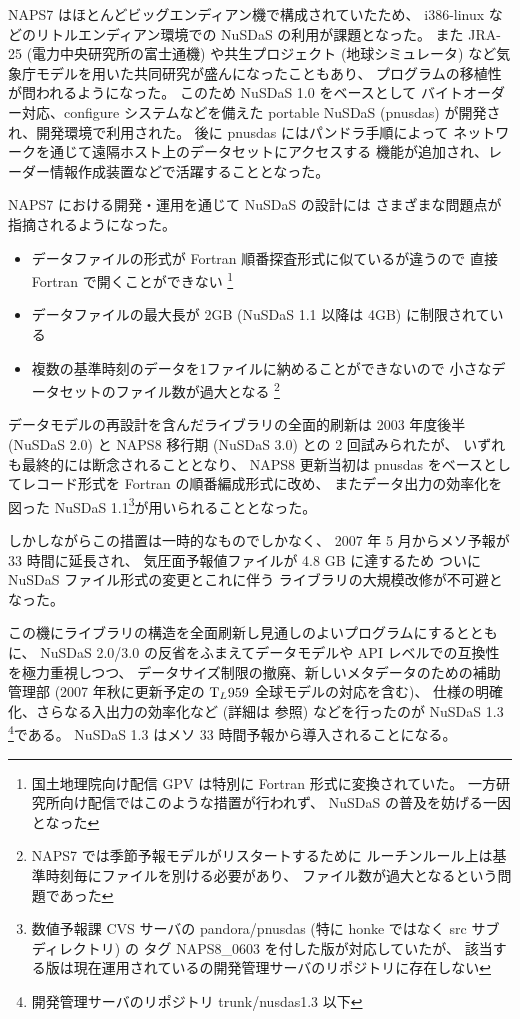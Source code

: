 NAPS7 はほとんどビッグエンディアン機で構成されていたため、
i386-linux などのリトルエンディアン環境での NuSDaS の利用が課題となった。
また JRA-25 (電力中央研究所の富士通機) や共生プロジェクト (地球シミュレータ)
など気象庁モデルを用いた共同研究が盛んになったこともあり、
プログラムの移植性が問われるようになった。
このため NuSDaS 1.0 をベースとして
バイトオーダー対応、configure システムなどを備えた portable NuSDaS
(pnusdas) が開発され、開発環境で利用された。
後に pnusdas にはパンドラ手順によって
ネットワークを通じて遠隔ホスト上のデータセットにアクセスする
機能が追加され、レーダー情報作成装置などで活躍することとなった。

NAPS7 における開発・運用を通じて NuSDaS の設計には
さまざまな問題点が指摘されるようになった。
\begin{itemize}
 \item データファイルの形式が Fortran 順番探査形式に似ているが違うので
 直接 Fortran で開くことができない%
 \footnote{国土地理院向け配信 GPV は特別に Fortran 形式に変換されていた。
 一方研究所向け配信ではこのような措置が行われず、
 NuSDaS の普及を妨げる一因となった}
 \item
 データファイルの最大長が 2GB (NuSDaS 1.1 以降は 4GB)
 に制限されている
 \item 複数の基準時刻のデータを1ファイルに納めることができないので
 小さなデータセットのファイル数が過大となる%
 \footnote{NAPS7 では季節予報モデルがリスタートするために
 ルーチンルール上は基準時刻毎にファイルを別ける必要があり、
 ファイル数が過大となるという問題であった}
\end{itemize}
データモデルの再設計を含んだライブラリの全面的刷新は
2003 年度後半 (NuSDaS 2.0) と
NAPS8 移行期 (NuSDaS 3.0) との 2 回試みられたが、
いずれも最終的には断念されることとなり、
NAPS8 更新当初は pnusdas をベースとしてレコード形式を
Fortran の順番編成形式に改め、
またデータ出力の効率化を図った NuSDaS 1.1\footnote{
	数値予報課 CVS サーバの pandora/pnusdas
	(特に honke ではなく src サブディレクトリ) の
	タグ NAPS8\_0603 を付した版が対応していたが、
	該当する版は現在運用されているの開発管理サーバのリポジトリに存在しない
}が用いられることとなった。

しかしながらこの措置は一時的なものでしかなく、
2007 年 5 月からメソ予報が 33 時間に延長され、
気圧面予報値ファイルが 4.8 GB に達するため
ついに NuSDaS ファイル形式の変更とこれに伴う
ライブラリの大規模改修が不可避となった。

この機にライブラリの構造を全面刷新し見通しのよいプログラムにするとともに、
NuSDaS 2.0/3.0 の反省をふまえてデータモデルや
API レベルでの互換性を極力重視しつつ、
データサイズ制限の撤廃、新しいメタデータのための補助管理部
(2007 年秋に更新予定の ${\rm T}_L959$ 全球モデルの対応を含む)、
仕様の明確化、さらなる入出力の効率化など
(詳細は  参照)
などを行ったのが NuSDaS 1.3 \footnote{
	 開発管理サーバのリポジトリ trunk/nusdas1.3 以下
}である。
NuSDaS 1.3 はメソ 33 時間予報から導入されることになる。

